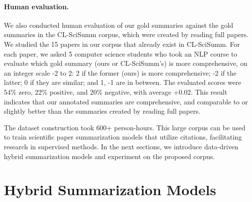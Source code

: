 \documentclass[letterpaper]{article} \usepackage{aaai19}  \usepackage{times}  \usepackage{helvet}  \usepackage{courier}  \usepackage{url}
\begin{document}
\paragraph{Human evaluation.}

We also conducted human evaluation of
our gold summaries against the gold summaries
in
the CL-SciSumm corpus,
which were created by reading full papers.
We studied the 15 papers in our corpus that already exist in CL-SciSumm.
For each paper,
we asked 5 computer science students who took an NLP course
to evaluate which gold summary (ours or CL-SciSumm's) is more comprehensive, on an integer scale -2 to 2: 2 if the former (ours) is more comprehensive; -2 if the latter; 0 if they are similar; and 1, -1 are in between.
The evaluated scores were
54\% zero, 22\%
positive, and 20\%
negative, with average
+0.02.
This result indicates that our annotated summaries are comprehensive, and comparable to
or slightly better than
the summaries created by reading full papers.\vspace{0.5mm}




The dataset construction took
600+ person-hours.
This large corpus
can be used to train scientific paper summarization models that utilize citations, facilitating research in supervised methods.
In the next sections, we introduce data-driven hybrid summarization models and experiment on the proposed corpus.









\section{Hybrid Summarization Models}
\end{document}
